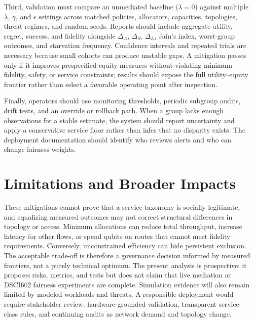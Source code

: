 \documentclass[10pt,conference]{IEEEtran}
\begin{document}
Third, validation must compare an unmediated baseline ($\lambda=0$) against multiple $\lambda$, $\gamma$, and $\epsilon$ settings across matched policies, allocators, capacities, topologies, threat regimes, and random seeds. Reports should include aggregate utility, regret, success, and fidelity alongside $\Delta_A$, $\Delta_S$, $\Delta_L$, Jain's index, worst-group outcomes, and starvation frequency. Confidence intervals and repeated trials are necessary because small cohorts can produce unstable gaps. A mitigation passes only if it improves prespecified equity measures without violating minimum fidelity, safety, or service constraints; results should expose the full utility--equity frontier rather than select a favorable operating point after inspection.

Finally, operators should use monitoring thresholds, periodic subgroup audits, drift tests, and an override or rollback path. When a group lacks enough observations for a stable estimate, the system should report uncertainty and apply a conservative service floor rather than infer that no disparity exists. The deployment documentation should identify who reviews alerts and who can change fairness weights.

\section{Limitations and Broader Impacts}

These mitigations cannot prove that a service taxonomy is socially legitimate, and equalizing measured outcomes may not correct structural differences in topology or access. Minimum allocations can reduce total throughput, increase latency for other flows, or spend qubits on routes that cannot meet fidelity requirements. Conversely, unconstrained efficiency can hide persistent exclusion. The acceptable trade-off is therefore a governance decision informed by measured frontiers, not a purely technical optimum. The present analysis is prospective: it proposes risks, metrics, and tests but does not claim that live mediation or DSCI602 fairness experiments are complete. Simulation evidence will also remain limited by modeled workloads and threats. A responsible deployment would require stakeholder review, hardware-grounded validation, transparent service-class rules, and continuing audits as network demand and topology change.

\clearpage


\end{document}
